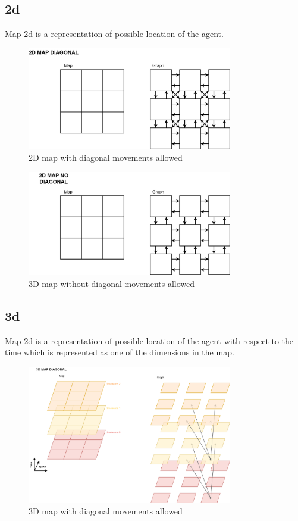 \subsection{2d}
Map 2d is a representation of possible location of the agent.
\begin{figure}[H]
    \centering
    \includegraphics[width=0.8\textwidth]{pictures/map_2D_diag.png}
    \caption{ 2D map with diagonal movements allowed }
    \label{fig:map_2D_diag}
\end{figure}

\begin{figure}[H]
    \centering
    \includegraphics[width=0.8\textwidth]{pictures/map_2D_no_diag.png}
    \caption{ 3D map without diagonal movements allowed }
    \label{fig:map_2D_no_diag}
\end{figure}

\subsection{3d}
Map 2d is a representation of possible location of the agent with respect to the time which is represented as one of the dimensions in the map.
\begin{figure}[H]
    \centering
    \includegraphics[width=0.8\textwidth]{pictures/map_3D_diag.png}
    \caption{ 3D map with diagonal movements allowed }
    \label{fig:map_3D_diag}
\end{figure}

